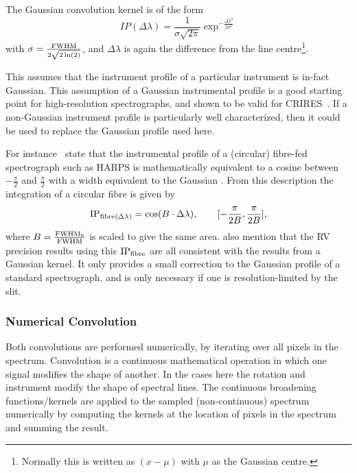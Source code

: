 The Gaussian convolution kernel is of the form
\begin{equation}
IP(\Delta\lambda) = \frac{1}{\sigma \sqrt{2\pi}} \exp^{-\frac{{\Delta\lambda}^{2}}{2 {\sigma}^{2}}}
\label{eqn:IP_profile}
\end{equation}
with $\sigma = \frac{\textrm{FWHM}}{2\sqrt{2 \ln(2)}}$, and $\Delta \lambda$ is again the difference from the line centre\footnote{Normally this is written as $(x-\mu)$ with $\mu$ as the Gaussian centre.}.

This assumes that the instrument profile of a particular instrument is in-fact Gaussian.
This assumption of a Gaussian instrumental profile is a good starting point for high-resolution spectrographs, and shown to be valid for CRIRES~\citep{seifahrt_synthesising_2010}.
If a non-Gaussian instrument profile is particularly well characterized, then it could be used to replace the Gaussian profile used here.

For instance~\citet{artigau_optical_2018} state that the instrumental profile of a (circular) fibre-fed spectrograph such as {HARPS} is mathematically equivalent to a cosine between $-\frac{\pi}{2}$ and $\frac{\pi}{2}$ with a width equivalent to the Gaussian {\fwhm}.
From this description the integration of a circular fibre is given by
\begin{equation}
\textrm{IP}{}_{\textrm{fibre}(\Delta\lambda)} = \cos(B\cdot\Delta\lambda),  \hspace{2em} [-\frac{\pi}{2 B}, \frac{\pi}{2 B}],
\end{equation}
where {$B = \frac{\textrm{FWHM}_{0}}{\textrm{FWHM}}$ } is scaled to give the same area.
\citet{artigau_optical_2018} also mention that the {RV} precision results using this $\textrm{IP}{}_{\textrm{fibre}}$ are all consistent with the results from a Gaussian kernel.
It only provides a small correction to the Gaussian profile of a standard spectrograph, and is only necessary if one is resolution-limited by the slit.%

\subsubsection*{Numerical Convolution}
\label{subsubsec:numerical_convolution}
Both convolutions are performed numerically, by iterating over all pixels in the spectrum.
Convolution is a continuous mathematical operation in which one signal modifies the shape of another.
In the cases here the rotation and instrument modify the shape of spectral lines.
The continuous broadening functions/kernels are applied to the sampled (non-continuous) spectrum numerically by computing the kernels at the location of pixels in the spectrum and summing the result.

